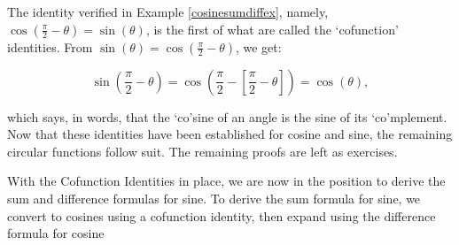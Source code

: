 \medskip


The identity verified in Example \ref{cosinesumdiffex}, namely, $\cos\left(\frac{\pi}{2} - \theta\right) = \sin(\theta)$,  is the first of what are called the `cofunction' identities.   From $ \sin(\theta) = \cos\left(\frac{\pi}{2} - \theta\right) $, we get:

\[ \sin\left(\dfrac{\pi}{2} - \theta\right) = \cos\left(\dfrac{\pi}{2} -\left[\dfrac{\pi}{2} - \theta\right]\right) = \cos(\theta),\]

which says, in words, that the `co'sine of an angle is the sine of its `co'mplement.  Now that these identities have been established for cosine and sine, the remaining circular functions follow suit.  The remaining proofs are left as exercises.

\medskip


\medskip

With the Cofunction Identities in place, we are now in the position to derive the sum and difference formulas for sine.  To derive the sum formula for sine, we convert to cosines using a cofunction identity, then expand using the difference formula for cosine

